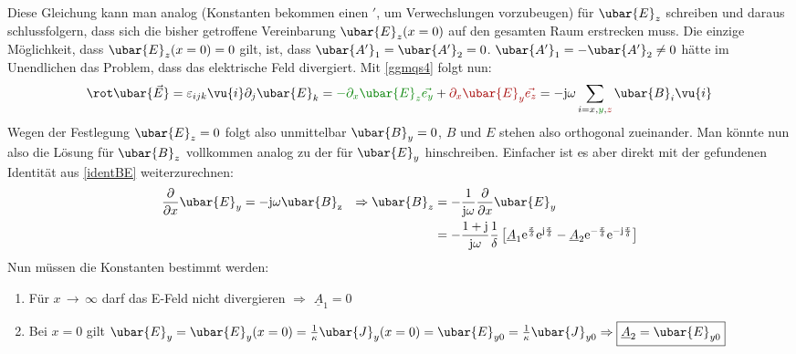 		Diese Gleichung kann man analog (Konstanten bekommen einen $'$, um Verwechslungen vorzubeugen) für $\ubar{E}_z$ schreiben und daraus schlussfolgern, dass sich die bisher getroffene Vereinbarung $\ubar{E}_z(x=0)$ auf den gesamten Raum erstrecken muss. Die einzige Möglichkeit, dass $\ubar{E}_z(x=0)=0$ gilt, ist, dass $\ubar{A'}_1=\ubar{A'}_2=0$. $\ubar{A'}_1=-\ubar{A'}_2\neq0$ hätte im Unendlichen das Problem, dass das elektrische Feld divergiert.  Mit \ref{ggmqs4} folgt nun:
		 \begin{equation}\label{identBE}\rot \ubar{\vec{E}} = \varepsilon_{ijk} \vu{i} \partial_j\ubar{E}_k = \textcolor{green}{-\partial_x\ubar{E}_z \vec{e_y}} + \textcolor{red}{\partial_x\ubar{E}_y \vec{e_z}} = -\mathrm{j}\omega   \sum_{i=x,\textcolor{green}{y},\textcolor{red}{z}}\ubar{B}_i \vu{i}
		 \end{equation}
		  Wegen der Festlegung $\ubar{E}_z=0$ folgt also unmittelbar $\ubar{B}_y=0$, $B$  und $E$ stehen also orthogonal zueinander. Man könnte nun also die Lösung für $\ubar{B}_z$ vollkommen analog zu der für $\ubar{E}_y$ hinschreiben. Einfacher ist es aber direkt mit der gefundenen Identität aus \ref{identBE} weiterzurechnen:
			        \begin{align}
				        \dfrac{\partial}{\partial x} \ubar{E}_y & = -\mathrm{j}\omega\ubar{B}_\mathrm{z} & \Rightarrow \ubar{B}_z & = -\dfrac{1}{\mathrm{j}\omega} \dfrac{\partial}{\partial x} \ubar{E}_y                                                                                                                                                                                               \nonumber\\
				                                                &                                        &                        & = -\dfrac{1 + \mathrm{j}}{\mathrm{j}\omega}  \dfrac{1}{\delta}  \left[ \underline{A}_1   \mathrm{e}^{\frac{x}{\delta}}   \mathrm{e}^{\mathrm{j}\frac{x}{\delta}} - \underline{A}_2  \mathrm{e}^{-\frac{x}{\delta}}  \mathrm{e}^{-\mathrm{j}\frac{x}{\delta}} \right]
			        \end{align}
			  Nun müssen die Konstanten bestimmt werden:
			        \begin{enumerate}
				        \item Für \(x \,\rightarrow\, \infty \)  darf das E-Feld nicht divergieren $\Rightarrow$
				              $\boxed{\underline{A}_1 = 0}$
				        \item Bei \(x = 0 \) gilt $\ubar{E}_{y} = \ubar{E}_{y}(x = 0) = \frac{1}{\kappa}\ubar{J}_y(x=0)=\ubar{E}_{y0} =\frac{1}{\kappa}\ubar{J}_{y0}  \Rightarrow \boxed{\underline{A}_2 = \ubar{E}_{y0}}$
			        \end{enumerate}
